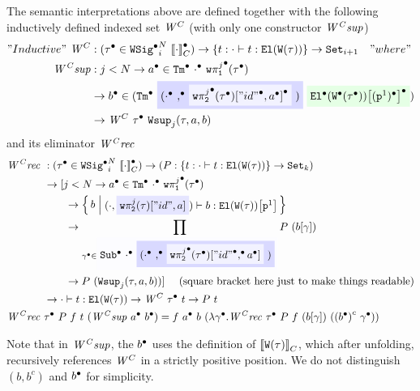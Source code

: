 The semantic interpretations above are defined together with the following inductively defined indexed set $\mathit{W}^C$ (with only one constructor $\mathit{W^Csup}$)
%
\begin{align*}
  "Inductive"~\CWmodel &: (\Glued{\wsig} \in \GWSig{i}{\denotesCC{\cdot}}{N}) \to \{ t : \goodTerm{\cdot}{t}{\El{\wcode{\wsig}}} \} \to \Set{i + 1} \quad "where" \\
    \CWsup &: j < N \to \Glued{a} \in \GTm{\Glued{\cdot}}{\Gwsigproj{j}{1}{\Glued{\wsig}}} \\
    & \to \Glued{b} \in (\GTm{
      \colorbox{blue!15}{(\Glued{\cdot} \Glued{,} 
      \colorbox{blue!5}{\Gsub{\Gwsigproj{j}{2}{\Glued{\wsig}}}{\SubstExt{\GSubstId}{\Glued{a}}}} )} 
      }{
        \colorbox{green!10}{\Gsub{\GEl{\Gwcode{\Glued{\wsig}}}}{\GSubstWeak{1}}}
        }) \\
    & \to \CWmodel~\Glued{\wsig}~\Wsup{j}{\wsig}{a}{b}
\end{align*}
and its eliminator $\mathit{W^Crec}$
\begin{align*}
  \CWrec \  &: (\Glued{\wsig} \in \GWSig{i}{\denotesCC{\cdot}}{N}) \to 
    (P : \{ t : \goodTerm{\cdot}{t}{\El{\wcode{\wsig}}} \} \to \Set{k})  \\
    & \to 
    [j < N \to  \Glued{a} \in \GTm{\Glued{\cdot}}{\Gwsigproj{j}{1}{\Glued{\wsig}}} \\ 
    & \quad \quad \to 
    \setc{b}{\goodTerm{({\cdot} , 
    \colorbox{blue!10}{\sub{\wsigproj{j}{2}{{\wsig}}}{\SubstExt{"id"}{{a}}}}
    ) }{b}{\sub{\El{\wcode{\wsig}}}{\SubstWeak{1}}}} \\ 
    & \quad \quad \to  \prod_{
      {\Glued{\gm} \in \colorbox{blue!1}{\GSub{\Glued{\cdot}}{
        \colorbox{blue!15}{(\Glued{\cdot} \Glued{,} 
    \colorbox{blue!5}{\sub{\Gwsigproj{j}{2}{\Glued{\wsig}}}{\GSubstExt{\GSubstId}{\Glued{a}}}} )}}}
    }
    } P~(\sub{b}{ \gm }) \\
    & \quad \quad \to P~(\Wsup{j}{\wsig}{a}{b}) ] \quad \text{ (square bracket here just to make things readable)} \\
    & \to \goodTerm{\cdot}{t}{\El{\wcode{\wsig}}} \to \CWmodel~\Glued{\wsig}~t \to P~t \\
  \CWrec \  & \Glued{\wsig}~P~f~t~(\CWsup~\Glued{a}~\Glued{b}) = f~\Glued{a}~b~(\lambda \Glued{\gm}. \CWrec~\Glued{\wsig}~P~f~(\sub{b}{\gm})~(\Gmodel{\Glued{b}}~\Glued{\gm}))
\end{align*}

Note that in $\mathit{W^Csup}$, the ${b}^\bullet$ uses the definition of
${\llbracket {\ensuremath{\texttt{W}({\tau})}} \rrbracket}_C$, which after unfolding, recursively references $\mathit{W}^C$
in a strictly positive position. %
We do not distinguish $(b, b^c)$ and ${b}^\bullet$ for simplicity. 

